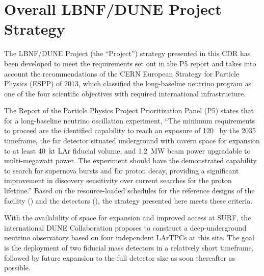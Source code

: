 
\section{Overall LBNF/DUNE Project Strategy} %

The LBNF/DUNE Project (the ``Project'') strategy presented in this CDR has been developed to meet the requirements 
set out in the P5 report and %
takes into account the recommendations of the CERN European Strategy for Particle 
Physics (ESPP) of 2013, which classified the long-baseline neutrino program as 
one of the four scientific objectives with required international infrastructure.

The Report of the Particle Physics Project Prioritization Panel (P5) 
states that for a long-baseline neutrino oscillation experiment, ``The 
minimum requirements to proceed are the identified capability to reach an exposure 
of \num{120}~\ktMWyr{} by the 2035 timeframe, the far detector situated underground 
with cavern space for expansion to at least 40~kt LAr fiducial volume, and 1.2~MW 
beam power upgradable to multi-megawatt power. The experiment should have the demonstrated 
capability to search for supernova bursts and for proton decay, providing a significant 
improvement in discovery sensitivity over current searches for the proton lifetime.'' 
Based on the resource-loaded schedules for the reference designs of the facility (\vollbnf)
and the detectors (\voldune), the strategy presented here meets these criteria. 

With the availability of space for expansion and improved access at SURF, %
the international DUNE Collaboration proposes to construct a deep-underground neutrino observatory based on four independent  LArTPCs at this site. %
The goal is the deployment of two  fiducial mass detectors in a relatively short timeframe, followed by future expansion to the full detector size as soon thereafter as possible. 

